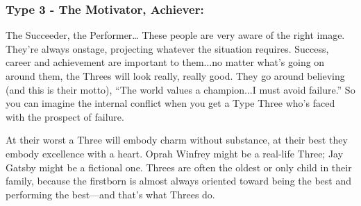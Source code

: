\documentclass[openleft,oneside,showtrims]{memoir}
\begin{document}
\subsubsection*{Type 3 - The Motivator, Achiever:}
\label{sec:org3ce7056}

The Succeeder, the Performer…  These people are very aware of the right image. They're always onstage, projecting whatever the situation requires. Success, career and achievement are important to them...no matter what's going on around them, the Threes will look really, really good. They go around believing (and this is their motto), ``The world values a champion...I must avoid failure.'' So you can imagine the internal conflict when you get a Type Three who's faced with the prospect of failure.

At their worst a Three will embody charm without substance, at their best they embody excellence with a heart. Oprah Winfrey might be a real-life Three; Jay Gatsby might be a fictional one. Threes are often the oldest or only child in their family, because the firstborn is almost always oriented toward being the best and performing the best—and that's what Threes do.
\end{document}
